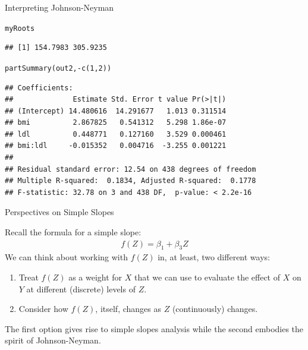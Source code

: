 \documentclass{beamer}\usepackage[]{graphicx}\usepackage[]{color}
\makeatletter
\newcommand{\hlnum}[1]{\textcolor[rgb]{0.69,0.494,0}{#1}}%
\newcommand{\hlopt}[1]{\textcolor[rgb]{0,0,0}{#1}}%
\newcommand{\hlstd}[1]{\textcolor[rgb]{0,0,0}{#1}}%
\newcommand{\hlkwd}[1]{\textcolor[rgb]{0.004,0.004,0.506}{#1}}%
\newenvironment{kframe}{%
 \def\at@end@of@kframe{}%
 \ifinner\ifhmode%
  \def\at@end@of@kframe{\end{minipage}}%
  \begin{minipage}{\columnwidth}%
 \fi\fi%
 \def\FrameCommand##1{\hskip\@totalleftmargin \hskip-\fboxsep
 \colorbox{shadecolor}{##1}\hskip-\fboxsep
     \hskip-\linewidth \hskip-\@totalleftmargin \hskip\columnwidth}%
 \MakeFramed {\advance\hsize-\width
   \@totalleftmargin\z@ \linewidth\hsize
   \@setminipage}}%
 {\par\unskip\endMakeFramed%
 \at@end@of@kframe}
\newenvironment{knitrout}{}{} %
\makeatother
\begin{document}
\begin{frame}[fragile]{Interpreting Johnson-Neyman}
  
\begin{knitrout}\footnotesize
{}\color{fgcolor}\begin{kframe}
\begin{alltt}
\hlstd{myRoots}
\end{alltt}
\begin{verbatim}
## [1] 154.7983 305.9235
\end{verbatim}
\begin{alltt}
\hlkwd{partSummary}\hlstd{(out2,} \hlopt{-}\hlkwd{c}\hlstd{(}\hlnum{1}\hlstd{,} \hlnum{2}\hlstd{))}
\end{alltt}
\begin{verbatim}
## Coefficients:
##              Estimate Std. Error t value Pr(>|t|)
## (Intercept) 14.480616  14.291677   1.013 0.311514
## bmi          2.867825   0.541312   5.298 1.86e-07
## ldl          0.448771   0.127160   3.529 0.000461
## bmi:ldl     -0.015352   0.004716  -3.255 0.001221
## 
## Residual standard error: 12.54 on 438 degrees of freedom
## Multiple R-squared:  0.1834,	Adjusted R-squared:  0.1778 
## F-statistic: 32.78 on 3 and 438 DF,  p-value: < 2.2e-16
\end{verbatim}
\end{kframe}
\end{knitrout}

\end{frame}

\watermarkon %

\begin{frame}{Perspectives on Simple Slopes}
  
  Recall the formula for a simple slope:
  \begin{align*}
    f(Z) = \beta_1 + \beta_3Z
  \end{align*}
  \vc We can think about working with $f(Z)$ in, at least, two different ways:
  \vb
  \begin{enumerate}
  \item Treat $f(Z)$ as a weight for $X$ that we can use to evaluate the effect 
    of $X$ on $Y$ at different (discrete) levels of $Z$.
    \vb
  \item Consider how $f(Z)$, itself, changes as $Z$ (continuously) changes.  
  \end{enumerate}
  \vb
  The first option gives rise to simple slopes analysis while the second 
  embodies the spirit of Johnson-Neyman.
  
\end{frame}
\end{document}
